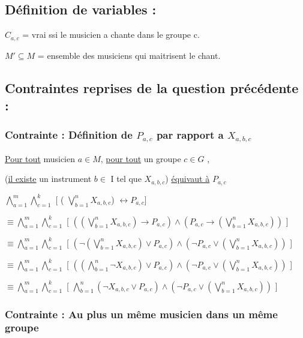 \documentclass[a4paper,10pt]{article}
\begin{document}
\subsection{Définition de variables : }

$ C_{a,c} $ = vrai ssi le musicien a chante dans le groupe c.

$M'\subseteq M$ = ensemble des musiciens qui maitrisent le chant.

\subsection{Contraintes reprises de la question précédente : }

\subsubsection{Contrainte : Définition de $P_{a,c}$ par rapport a $X_{a,b,c}$}

\underline{Pour tout} musicien $a \in M $, \underline{pour tout} un groupe $c \in G$ , 

(\underline{il existe} un instrument $b \in$ I  tel que $X_{a,b,c}$)
\underline{équivaut à} $P_{a,c}$

$\bigwedge \limits_{a=1}^{m}  \bigwedge \limits_{c=1}^{k}$ [ ( $\bigvee \limits_{b=1}^{n}  X_{a,b,c}$) $\leftrightarrow P_{a,c}$]

$\equiv  \bigwedge \limits_{a=1}^{m}  \bigwedge \limits_{c=1}^{k}$ [ $ ( (\bigvee \limits_{b=1}^{n}  X_{a,b,c}) \rightarrow P_{a,c} ) \wedge
(P_{a,c} \rightarrow  (\bigvee \limits_{b=1}^{n}  X_{a,b,c}) )$ ]

$\equiv  \bigwedge \limits_{a=1}^{m}  \bigwedge \limits_{c=1}^{k}$ [ $ ( \neg (\bigvee \limits_{b=1}^{n}  X_{a,b,c}) \vee P_{a,c} ) \wedge
 (\neg P_{a,c} \vee  (\bigvee \limits_{b=1}^{n}  X_{a,b,c}) )$ ]
 
$\equiv  \bigwedge \limits_{a=1}^{m}  \bigwedge \limits_{c=1}^{k}$ [ $ ( ( \bigwedge \limits_{b=1}^{n}  \neg X_{a,b,c}) \vee P_{a,c} ) \wedge
 (\neg P_{a,c} \vee  (\bigvee \limits_{b=1}^{n}  X_{a,b,c}) )$ ]
 
$\equiv  \bigwedge \limits_{a=1}^{m}  \bigwedge \limits_{c=1}^{k}$ [ $ \bigwedge \limits_{b=1}^{n}  ( \neg X_{a,b,c} \vee P_{a,c} ) \wedge
 (\neg P_{a,c} \vee  (\bigvee \limits_{b=1}^{n}  X_{a,b,c}) )$ ] 


\subsubsection{Contrainte : Au plus un même musicien dans un même groupe}
\end{document}
